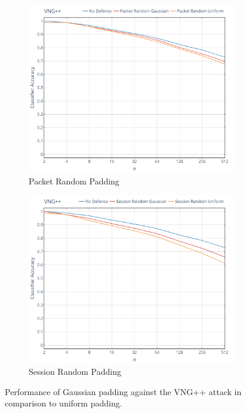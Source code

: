 \documentclass[
	ruledheaders=chapter,
	class=report,
	thesis={type=master, department=inf},
	accentcolor=1c,
	custommargins=true,
	marginpar=false,
	parskip=half-,
	fontsize=11pt,
]{tudapub}
\begin{document}
	\begin{figure}[tbp]
		\begin{subfigure}{0.495\textwidth}
			\centering
			\includegraphics[width=\textwidth]{plots/performance_vng++_pkt.png}
			\caption{Packet Random Padding}
		\end{subfigure}
		\hfill
		\begin{subfigure}{0.495\textwidth}
			\centering
			\includegraphics[width=\textwidth]{plots/performance_vng++_ses.png}
			\caption{Session Random Padding}
		\end{subfigure}
		\caption[Performance of Gaussian padding against the VNG++ attack]{Performance of Gaussian padding against the VNG++ attack \cite{Dyer2012} in comparison to uniform padding.}
		\label{fig:vng++}
	\end{figure}
\end{document}
